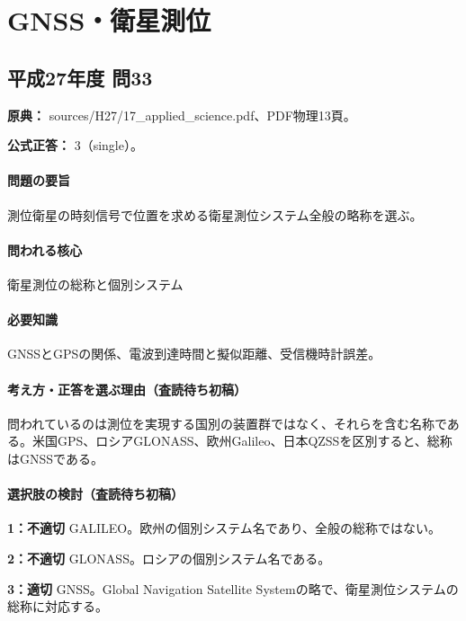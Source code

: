 \section{GNSS・衛星測位}

\subsection{平成27年度 問33}
\label{q:h27-reg-applied-33}

\noindent\textbf{原典：} sources/H27/17\_applied\_science.pdf、PDF物理13頁。

\textbf{公式正答：} 3（single）。

\paragraph{問題の要旨} 測位衛星の時刻信号で位置を求める衛星測位システム全般の略称を選ぶ。

\paragraph{問われる核心} 衛星測位の総称と個別システム

\paragraph{必要知識} GNSSとGPSの関係、電波到達時間と擬似距離、受信機時計誤差。

\paragraph{考え方・正答を選ぶ理由（査読待ち初稿）} 問われているのは測位を実現する国別の装置群ではなく、それらを含む名称である。米国GPS、ロシアGLONASS、欧州Galileo、日本QZSSを区別すると、総称はGNSSである。

\paragraph{選択肢の検討（査読待ち初稿）}\mbox{}\par

\noindent\textbf{1：不適切} GALILEO。欧州の個別システム名であり、全般の総称ではない。\par

\noindent\textbf{2：不適切} GLONASS。ロシアの個別システム名である。\par

\noindent\textbf{3：適切} GNSS。Global Navigation Satellite Systemの略で、衛星測位システムの総称に対応する。\par

